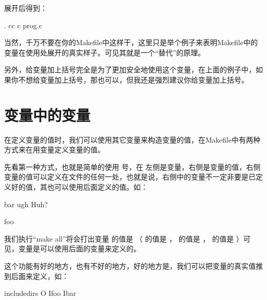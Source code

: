 \documentclass[a4paper,10pt]{sphinxmanual}
\begin{document}
展开后得到：

\begin{sphinxVerbatim}[commandchars=\\\{\}]
 .
    cc \PYGZhy{}c prog.c
\end{sphinxVerbatim}

当然，千万不要在你的Makefile中这样干，这里只是举个例子来表明Makefile中的变量在使用处展开的真实样子。可见其就是一个“替代”的原理。

另外，给变量加上括号完全是为了更加安全地使用这个变量，在上面的例子中，如果你不想给变量加上括号，那也可以，但我还是强烈建议你给变量加上括号。


\section{变量中的变量}
\label{\detokenize{variables:id3}}
在定义变量的值时，我们可以使用其它变量来构造变量的值，在Makefile中有两种方式来在用变量定义变量的值。

先看第一种方式，也就是简单的使用 \sphinxcode{\sphinxupquote{=}} 号，在 \sphinxcode{\sphinxupquote{=}} 左侧是变量，右侧是变量的值，右侧变量的值可以定义在文件的任何一处，也就是说，右侧中的变量不一定非要是已定义好的值，其也可以使用后面定义的值。如：

\begin{sphinxVerbatim}[commandchars=\\\{\}]
  bar
  ugh
  Huh?

     foo
\end{sphinxVerbatim}

我们执行“make all”将会打出变量  的值是  （   的值是
 ，  的值是  ，  的值是  ）可见，变量是可以使用后面的变量来定义的。

这个功能有好的地方，也有不好的地方，好的地方是，我们可以把变量的真实值推到后面来定义，如：

\begin{sphinxVerbatim}[commandchars=\\\{\}]
  include\PYGZus{}dirs \PYGZhy{}O
  \PYGZhy{}Ifoo \PYGZhy{}Ibar
\end{sphinxVerbatim}
\end{document}
